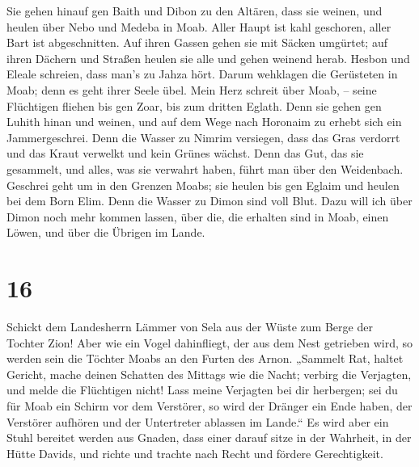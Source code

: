  Sie gehen hinauf gen Baith und Dibon zu den Altären, dass
sie weinen, und heulen über Nebo und Medeba in Moab. Aller Haupt ist
kahl geschoren, aller Bart ist abgeschnitten.  Auf ihren
Gassen gehen sie mit Säcken umgürtet; auf ihren Dächern und Straßen
heulen sie alle und gehen weinend herab.  Hesbon und
Eleale schreien, dass man's zu Jahza hört. Darum wehklagen die
Gerüsteten in Moab; denn es geht ihrer Seele übel.  Mein
Herz schreit über Moab, -- seine Flüchtigen fliehen bis gen Zoar, bis
zum dritten Eglath. Denn sie gehen gen Luhith hinan und weinen, und auf
dem Wege nach Horonaim zu erhebt sich ein Jammergeschrei. 
Denn die Wasser zu Nimrim versiegen, dass das Gras verdorrt und das
Kraut verwelkt und kein Grünes wächst.  Denn das Gut, das
sie gesammelt, und alles, was sie verwahrt haben, führt man über den
Weidenbach.  Geschrei geht um in den Grenzen Moabs; sie
heulen bis gen Eglaim und heulen bei dem Born Elim.  Denn
die Wasser zu Dimon sind voll Blut. Dazu will ich über Dimon noch mehr
kommen lassen, über die, die erhalten sind in Moab, einen Löwen, und
über die Übrigen im Lande.

\hypertarget{section-15}{%
\section{16}\label{section-15}}

 Schickt dem Landesherrn Lämmer von Sela aus der Wüste zum
Berge der Tochter Zion!  Aber wie ein Vogel dahinfliegt,
der aus dem Nest getrieben wird, so werden sein die Töchter Moabs an den
Furten des Arnon.  „Sammelt Rat, haltet Gericht, mache
deinen Schatten des Mittags wie die Nacht; verbirg die Verjagten, und
melde die Flüchtigen nicht!  Lass meine Verjagten bei dir
herbergen; sei du für Moab ein Schirm vor dem Verstörer, so wird der
Dränger ein Ende haben, der Verstörer aufhören und der Untertreter
ablassen im Lande.``  Es wird aber ein Stuhl bereitet
werden aus Gnaden, dass einer darauf sitze in der Wahrheit, in der Hütte
Davids, und richte und trachte nach Recht und fördere Gerechtigkeit.

